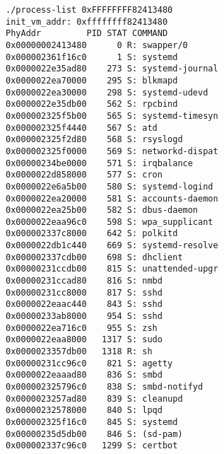 \begin{itembox}[l]{1}
    \begin{verbatim}
./process-list 0xFFFFFFFF82413480
init_vm_addr: 0xffffffff82413480
PhyAddr         PID STAT COMMAND
0x00000002413480      0 R: swapper/0
0x000002361f16c0      1 S: systemd
0x0000022e35ad80    273 S: systemd-journal
0x0000022ea70000    295 S: blkmapd
0x0000022ea30000    298 S: systemd-udevd
0x0000022e35db00    562 S: rpcbind
0x000002325f5b00    565 S: systemd-timesyn
0x000002325f4440    567 S: atd
0x000002325f2d80    568 S: rsyslogd
0x000002325f0000    569 S: networkd-dispat
0x00000234be0000    571 S: irqbalance
0x0000022d858000    577 S: cron
0x0000022e6a5b00    580 S: systemd-logind
0x0000022ea20000    581 S: accounts-daemon
0x0000022ea25b00    582 S: dbus-daemon
0x0000022eaa96c0    598 S: wpa_supplicant
0x000002337c8000    642 S: polkitd
0x0000022db1c440    669 S: systemd-resolve
0x000002337cdb00    698 S: dhclient
0x00000231ccdb00    815 S: unattended-upgr
0x00000231ccad80    816 S: nmbd
0x00000231cc8000    817 S: sshd
0x0000022eaac440    843 S: sshd
0x00000233ab8000    954 S: sshd
0x0000022ea716c0    955 S: zsh
0x0000022eaa8000   1317 S: sudo
0x0000023357db00   1318 R: sh
0x00000231cc96c0    821 S: agetty
0x0000022eaaad80    836 S: smbd
0x000002325796c0    838 S: smbd-notifyd
0x0000023257ad80    839 S: cleanupd
0x00000232578000    840 S: lpqd
0x000002325f16c0    845 S: systemd
0x00000235d5db00    846 S: (sd-pam)
0x000002337c96c0   1299 S: certbot
    \end{verbatim}
\end{itembox}


